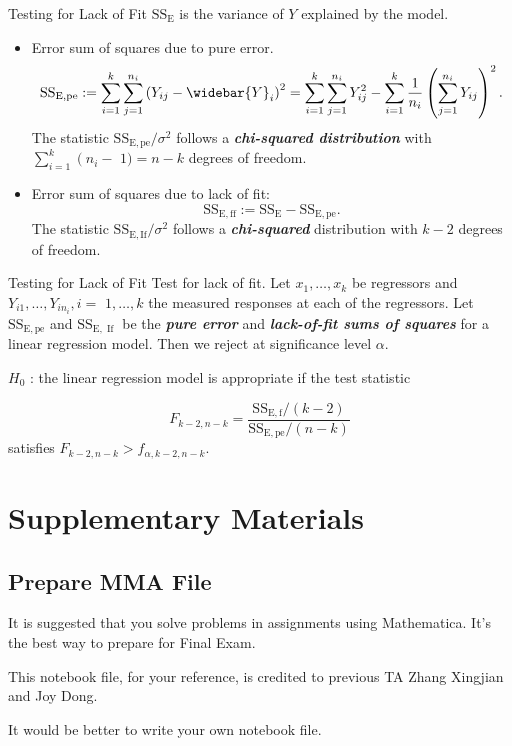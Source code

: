 \documentclass{beamer}
\newcommand{\bb}[1]{\textcolor{antiquefuchsia}{\textbf{\textit{#1}}}}
\begin{document}
\begin{frame}{Testing for Lack of Fit}
$\mathrm{SS}_{\mathrm{E}}$ is the variance of $Y$ explained by the model.
\begin{itemize}
\item Error sum of squares due to pure error.
$$
\mathrm{SS}_{\mathrm{E}, \mathrm{pe}}:=\sum_{i=1}^{k} \sum_{j=1}^{n_{i}}\left(Y_{i j}-\widebar{Y}_{i}\right)^{2}=\sum_{i=1}^{k} \sum_{j=1}^{n_{i}} Y_{i j}^{2}-\sum_{i=1}^{k} \frac{1}{n_{i}}\left(\sum_{j=1}^{n_{i}} Y_{i j}\right)^{2} .
$$
The statistic $\mathrm{SS}_{\mathrm{E}, \mathrm{pe}} / \sigma^{2}$ follows a \bb{chi-squared distribution} with $\sum_{i=1}^{k}\left(n_{i}-\right.$ $1)=n-k$ degrees of freedom.
\item Error sum of squares due to lack of fit:
$$
\mathrm{SS}_{\mathrm{E}, \mathrm{ff}}:=\mathrm{SS}_{\mathrm{E}}-\mathrm{SS}_{\mathrm{E}, \mathrm{pe}} .
$$
The statistic $\mathrm{SS}_{\mathrm{E}, \mathrm{If}} / \sigma^{2}$ follows a \bb{chi-squared} distribution with $k-2$ degrees of freedom.
\end{itemize}
\end{frame}

\begin{frame}{Testing for Lack of Fit}
Test for lack of fit. Let $x_{1}, \ldots, x_{k}$ be regressors and $Y_{i 1}, \ldots, Y_{i n_{i}}, i=$ $1, \ldots, k$ the measured responses at each of the regressors. Let $\mathrm{SS}_{\mathrm{E}, \mathrm{pe}}$ and $\mathrm{SS}_{\mathrm{E}, \text { If }}$ be the \bb{pure error} and \bb{lack-of-fit sums of squares} for a linear regression model. Then we reject at significance level $\alpha$.
\begin{center}
$H_{0}$ : the linear regression model is appropriate
if the test statistic
\end{center}
$$
F_{k-2, n-k}=\frac{\mathrm{SS}_{\mathrm{E}, \mathrm{f}} /(k-2)}{\mathrm{SS}_{\mathrm{E}, \mathrm{pe}} /(n-k)}
$$
satisfies $F_{k-2, n-k}>f_{\alpha, k-2, n-k}$.

\end{frame}


\section{Supplementary Materials}


\subsection{Prepare MMA File}
\begin{frame}
It is suggested that you solve problems in assignments using Mathematica. It's the best way to prepare for Final Exam.

This notebook file, for your reference, is credited to previous TA Zhang Xingjian and Joy Dong. 

It would be better to write your own notebook file.
\end{frame}
\end{document}
